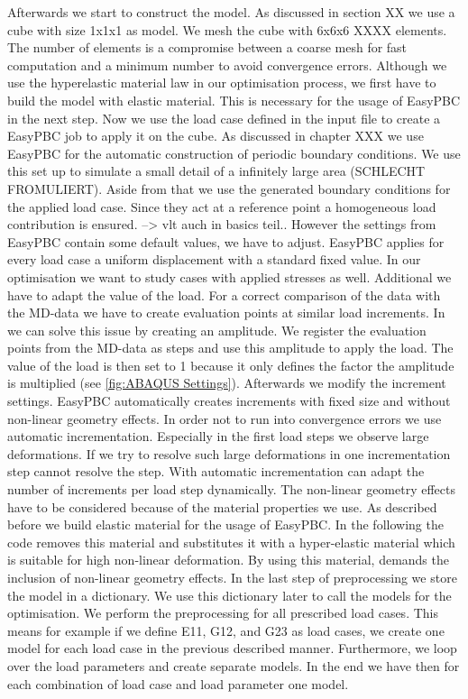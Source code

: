     Afterwards we start to construct the model. As discussed in section XX we use a cube with size 1x1x1 as model. We mesh the cube with 6x6x6 XXXX elements. The number of elements is a compromise between a coarse mesh for fast computation and a minimum number to avoid convergence errors. Although we use the hyperelastic material law in our optimisation process, we first have to build the model with elastic material. This is necessary for the usage of EasyPBC in the next step. Now we use the load case defined in the input file to create a EasyPBC job to apply it on the cube. As discussed in chapter XXX we use EasyPBC for the automatic construction of periodic boundary conditions. We use this set up to simulate a small detail of a infinitely large area (SCHLECHT FROMULIERT). Aside from that we use the generated boundary conditions for the applied load case. Since they act at a reference point a homogeneous load contribution is ensured. --> vlt auch in basics teil..
    However the settings from EasyPBC contain some default values, we have to adjust. EasyPBC applies for every load case a uniform displacement with a standard fixed value. In our optimisation we want to study cases with applied stresses as well. Additional we have to adapt the value of the load. For a correct comparison of the  data with the MD-data we have to create evaluation points at similar load increments. In  we can solve this issue by creating an amplitude. We register the evaluation points from the MD-data as steps and use this amplitude to apply the load. The value of the load is then set to 1 because it only defines the factor the amplitude is multiplied (see \autoref{fig:ABAQUS Settings}). Afterwards we modify the increment settings. EasyPBC automatically creates increments with fixed size and without non-linear geometry effects. In order not to run into convergence errors we use automatic incrementation. Especially in the first load steps we observe large deformations. If we try to resolve such large deformations in one incrementation step  cannot resolve the step. With automatic incrementation  can adapt the number of increments per load step dynamically. The non-linear geometry effects have to be considered because of the material properties we use. As described before we build elastic material for the usage of EasyPBC. In the following the code removes this material and substitutes it with a hyper-elastic material which is suitable for high non-linear deformation. By using this material,  demands the inclusion of non-linear geometry effects. In the last step of preprocessing we store the model in a dictionary. We use this dictionary later to call the models for the optimisation. We perform the preprocessing for all prescribed load cases. This means for example if we define E11, G12, and G23 as load cases, we create one model for each load case in the previous described manner. Furthermore, we loop over the load parameters and create separate models. In the end we have then for each combination of load case and load parameter one model. 

